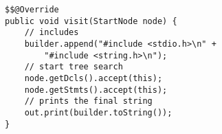 \begin{lstlisting}[caption={Visit start node in C code generator}, label={io01}]
$$@Override
public void visit(StartNode node) {
    // includes
    builder.append("#include <stdio.h>\n" +
        "#include <string.h>\n");
    // start tree search
    node.getDcls().accept(this);
    node.getStmts().accept(this);
    // prints the final string
    out.print(builder.toString());
}
\end{lstlisting}